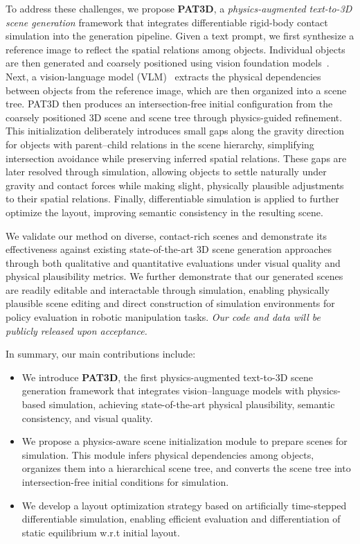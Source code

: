 To address these challenges, we propose \textbf{PAT3D}, a \textit{physics-augmented text-to-3D scene generation} framework that integrates differentiable rigid-body contact simulation into the generation pipeline. 
Given a text prompt, we first synthesize a reference image to reflect the spatial relations among objects. 
Individual objects are then generated and coarsely positioned using vision foundation models~\cite{depthpro,kirillov2023segment,hunyuan3d22025tencent}. 
Next, a vision-language model (VLM)~\cite{hurst2024gpt} extracts the physical dependencies between objects from the reference image, which are then organized into a scene tree. 
PAT3D then produces an intersection-free initial configuration from the coarsely positioned 3D scene and scene tree through physics-guided refinement. This initialization deliberately introduces small gaps along the gravity direction for objects with parent–child relations in the scene hierarchy, simplifying intersection avoidance while preserving inferred spatial relations. These gaps are later resolved through simulation, allowing objects to settle naturally under gravity and contact forces while making slight, physically plausible adjustments to their spatial relations. Finally, differentiable simulation is applied to further optimize the layout, improving semantic consistency in the resulting scene.

We validate our method on diverse, contact-rich scenes and demonstrate its effectiveness against existing state-of-the-art 3D scene generation approaches through both qualitative and quantitative evaluations under visual quality and physical plausibility metrics. We further demonstrate that our generated scenes are readily editable and interactable through simulation, enabling physically plausible scene editing and direct construction of simulation environments for policy evaluation in robotic manipulation tasks. \textit{Our code and data will be publicly released upon acceptance.}

In summary, our main contributions include:

\begin{itemize}
  \item We introduce \textbf{PAT3D}, the first physics-augmented text-to-3D scene generation framework that integrates vision–language models with physics-based simulation, achieving state-of-the-art physical plausibility, semantic consistency, and visual quality.
  
    \item We propose a physics-aware scene initialization module to prepare scenes for simulation. This module infers physical dependencies among objects, organizes them into a hierarchical scene tree, and converts the scene tree into intersection-free initial conditions for simulation.
  
  \item We develop a layout optimization strategy based on artificially time-stepped differentiable simulation, enabling efficient evaluation and differentiation of static equilibrium w.r.t initial layout.

\end{itemize}
